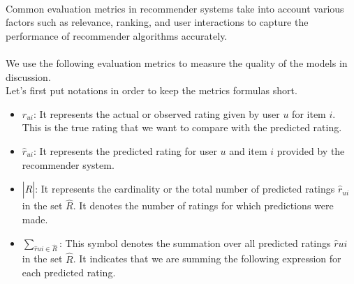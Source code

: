 \documentclass{cup-pan}
\begin{document}
\paragraph{}
Common evaluation metrics in recommender systems take into account various factors such as relevance, ranking, and user interactions to capture the performance of recommender algorithms accurately.
\paragraph{}
We use the following evaluation metrics to measure the quality of the models in discussion.
\\
Let's first put notations in order to keep the metrics formulas short.
\begin{itemize}
  \item $r_{ui}$: It represents the actual or observed rating given by user $u$ for item $i$. This is the true rating that we want to compare with the predicted rating.
  \item $\hat{r}_{ui}$: It represents the predicted rating for user $u$ and item $i$ provided by the recommender system.
  \item $|\hat{R}|$: It represents the cardinality or the total number of predicted ratings $\hat{r}_{ui}$ in the set $\hat{R}$. It denotes the number of ratings for which predictions were made.
  \item $\sum_{\hat{r}{ui} \in \hat{R}}$: This symbol denotes the summation over all predicted ratings $\hat{r}{ui}$ in the set $\hat{R}$. It indicates that we are summing the following expression for each predicted rating.
\end{itemize}
\end{document}
